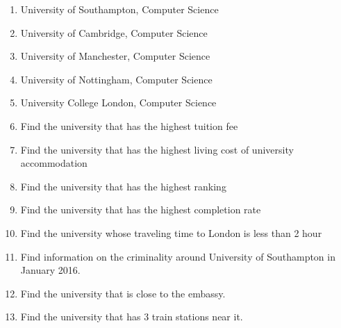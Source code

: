 \begin{enumerate}
\item[\textbullet] University of Southampton, Computer Science
\item[\textbullet] University of Cambridge, Computer Science
\item[\textbullet] University of Manchester, Computer Science
\item[\textbullet] University of Nottingham, Computer Science
\item[\textbullet] University College London, Computer Science
\item Find the university that has the highest tuition fee
\item Find the university that has the highest living cost of university accommodation
\item Find the university that has the highest ranking
\item Find the university that has the highest completion rate
\item Find the university whose traveling time to London is less than 2 hour
\item Find information on the criminality around University of Southampton in January 2016.
\item Find the university that is close to the embassy.
\item Find the university that has 3 train stations near it.
\end{enumerate}


